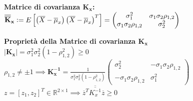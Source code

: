 \documentclass[a4paper,10pt]{article}
\newcommand{\1}{\mathbf{1}}
\begin{document}
\textbf{Matrice di covarianza \(\mathbf{K_x}\):} 
\(\mathbf{\overline{\overline{K}}_x} \vcentcolon =E\left[\left(\overline{X}-\overline{\mu}_x\right){\left(\overline{X}-\overline{\mu}_x\right)}^T\right] =
    \begin{pmatrix}
        \sigma^2_1 & \sigma_1\sigma_2\rho_{1,2} \\
        \sigma_1\sigma_2\rho_{1,2} & \sigma^2_2
    \end{pmatrix}\)
    
\textbf{Proprietà della Matrice di covarianza \(\mathbf{K_x}\)}
\\\(\lvert\mathbf{K_x}\rvert = \sigma^2_1\sigma^2_2\left(1-\rho^2_{1,2}\right) \geq 0\) 
\\\(\rho_{1,2} \neq \pm 1 \implies \mathbf{K^{-1}_x} = \frac{1}{\sigma^2_1\sigma^2_2\left(1-\rho^2_{1,2}\right)}\begin{pmatrix}
        \sigma^2_2 & -\sigma_1\sigma_2\rho_{1,2} \\
        -\sigma_1\sigma_2\rho_{1,2} & \sigma^2_1
    \end{pmatrix}\)
\\\(z = {\left[z_1,z_2\right]}^T \in \mathbb{R}^{2\times 1}\implies \overline{z}^T\overline{\overline{K^{-1}_x}}\overline{z}\geq 0\)
\\
\end{document}
